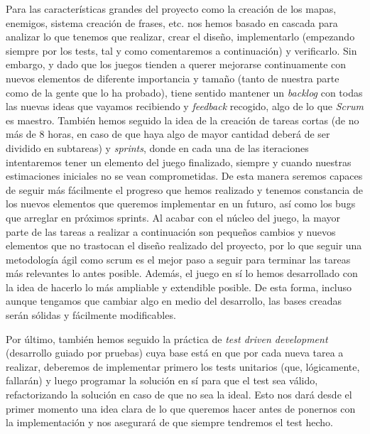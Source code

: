 Para las características grandes del proyecto como la creación de los mapas, enemigos, sistema creación de frases, etc. nos hemos basado en cascada para analizar lo que tenemos que realizar, crear el diseño, implementarlo (empezando siempre por los tests, tal y como comentaremos a continuación) y verificarlo. Sin embargo, y dado que los juegos tienden a querer mejorarse continuamente con nuevos elementos de diferente importancia y tamaño (tanto de nuestra parte como de la gente que lo ha probado), tiene sentido mantener un \textit{backlog} con todas las nuevas ideas que vayamos recibiendo y \textit{feedback} recogido, algo de lo que \textit{Scrum} es maestro. 
También hemos seguido la idea de la creación de tareas cortas (de no más de 8 horas, en caso de que haya algo de mayor cantidad deberá de ser dividido en subtareas) y \textit{sprints}, donde en cada una de las iteraciones intentaremos tener un elemento del juego finalizado, siempre y cuando nuestras estimaciones iniciales no se vean comprometidas. De esta manera seremos capaces de seguir más fácilmente el progreso que hemos realizado y tenemos constancia de los nuevos elementos que queremos implementar en un futuro, así como los bugs que arreglar en próximos sprints.
Al acabar con el núcleo del juego, la mayor parte de las tareas a realizar a continuación son pequeños cambios y nuevos elementos que no trastocan el diseño realizado del proyecto, por lo que seguir una metodología ágil como scrum es el mejor paso a seguir para terminar las tareas más relevantes lo antes posible. Además, el juego en sí lo hemos desarrollado con la idea de hacerlo lo más ampliable y extendible posible. De esta forma, incluso aunque tengamos que cambiar algo en medio del desarrollo, las bases creadas serán sólidas y fácilmente modificables. 

Por último, también hemos seguido la práctica de \textit{test driven development} (desarrollo guiado por pruebas) cuya base está en que por cada nueva tarea a realizar, deberemos de implementar primero los tests unitarios (que, lógicamente, fallarán) y luego programar la solución en sí para que el test sea válido, refactorizando la solución en caso de que no sea la ideal. Esto nos dará desde el primer momento una idea clara de lo que queremos hacer antes de ponernos con la implementación y nos asegurará de que siempre tendremos el test hecho.
